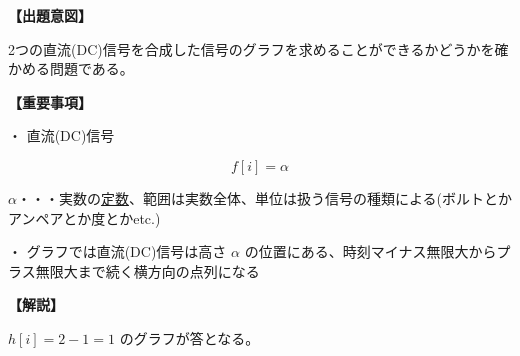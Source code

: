 \noindent \textbf{【出題意図】}

\noindent 2つの直流(DC)信号を合成した信号のグラフを求めることができるかどうかを確かめる問題である。

\vspace{1em}
\noindent \textbf{【重要事項】}

\medskip
\noindent・ 直流(DC)信号

\[
f[i] = \alpha
\]

\bigskip
\noindent $\alpha$・・・実数の\underline{定数}、範囲は実数全体、単位は扱う信号の種類による(ボルトとかアンペアとか度とかetc.)

\bigskip
\noindent・ グラフでは直流(DC)信号は高さ $\alpha$ の位置にある、時刻マイナス無限大からプラス無限大まで続く横方向の点列になる

\vspace{1em}
\noindent \textbf{【解説】}

\noindent $h[i] = 2-1 = 1$ のグラフが答となる。
